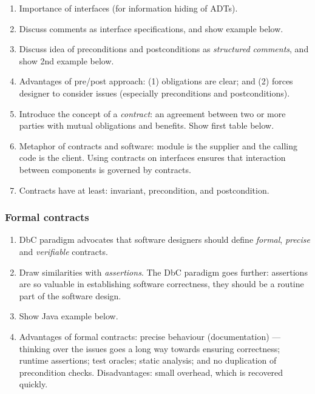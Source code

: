 \documentclass[11pt]{article}
\begin{document}
\begin{enumerate}

 \item Importance of interfaces (for information hiding of ADTs).
 
 \item Discuss comments as interface specifications, and show example below.

 \item Discuss idea of preconditions and postconditions as \emph{structured comments}, and show 2nd example below.

 \item Advantages of pre/post approach: (1) obligations are clear; and (2) forces designer to consider issues (especially preconditions and postconditions).

 \item Introduce the concept of a \emph{contract}:  an agreement between two or more parties with mutual obligations and benefits.  Show first table below.

 \item Metaphor of contracts and software: module is the supplier and the calling code is the client. Using contracts on interfaces ensures that interaction between components is governed by contracts.

 \item Contracts have at least: invariant, precondition, and postcondition.

\end{enumerate}

\subsubsection*{Formal contracts}

\begin{enumerate}

 \item DbC paradigm advocates that software designers should define \emph{formal}, \emph{precise} and \emph{verifiable} contracts. 

 \item Draw similarities with \emph{assertions}. The DbC paradigm goes further:  assertions are so valuable in establishing software correctness, they should be a routine part of the software design.

 \item Show Java  example below.

 \item Advantages of formal contracts: precise behaviour (documentation) --- thinking over the issues goes a long way towards ensuring correctness; runtime assertions; test oracles; static analysis; and no duplication of precondition checks.  Disadvantages: small overhead, which is recovered quickly.

\end{enumerate}
\end{document}
